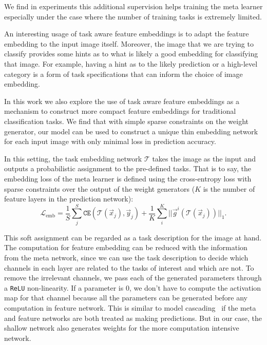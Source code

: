 \documentclass[10pt,twocolumn,letterpaper]{article}
\begin{document}
We find in experiments this additional supervision helps training the meta learner
especially under the case where the number of training tasks is extremely limited. 

An interesting usage of task aware feature embeddings is to adapt the feature embedding to the input image itself.  
Moreover, the image that we are trying to classify provides some hints as to what is likely a good embedding for classifying that image.
For example, having a hint as to the likely prediction or a high-level category is a form of task specifications that can inform the choice of image embedding.


In this work we also explore the use of task aware feature embeddings as a mechanism to construct more compact feature embeddings for traditional classification tasks.
We find that with simple sparse constraints on the weight generator, our model can be used to construct a unique thin embedding network for each input image with only minimal loss in prediction accuracy.

In this setting, the task embedding network $\mathcal{T}$ takes the image as the input and outputs a probabilistic assignment to the pre-defined tasks. 
That is to say, the embedding loss of the meta learner is defined using the cross-entropy loss with sparse constraints over the output of the weight generators ($K$ is the number of feature layers in the prediction network):
\begin{equation}
    \mathcal{L}_\text{emb} = \frac{1}{S}\sum_j^S \texttt{CE}(\mathcal{T}(\Vec{x}_j), \Vec{y}_j) + \frac{1}{K}\sum_i^K||\Vec{g}^i(\mathcal{T}(\Vec{x}_j))||_1.
    \label{eq:ef_emb}
\end{equation}

This soft assignment can be regarded as a task description for the image at hand. 
The computation for feature embedding can be reduced with the information from the meta network, since we can use the task description to decide which channels in each layer are related to the tasks of interest and which are not. To remove the irrelevant channels, we pass each of the generated parameters through a {\tt ReLU} non-linearity.
If a parameter is 0, we don't have to compute the activation map for that channel because all the parameters can be generated before any computation in feature network. 
This is similar to model cascading~\cite{wang2017idk} if the meta and feature networks are both treated as making predictions. 
But in our case, the shallow network also generates weights for the more computation intensive network.
\end{document}
